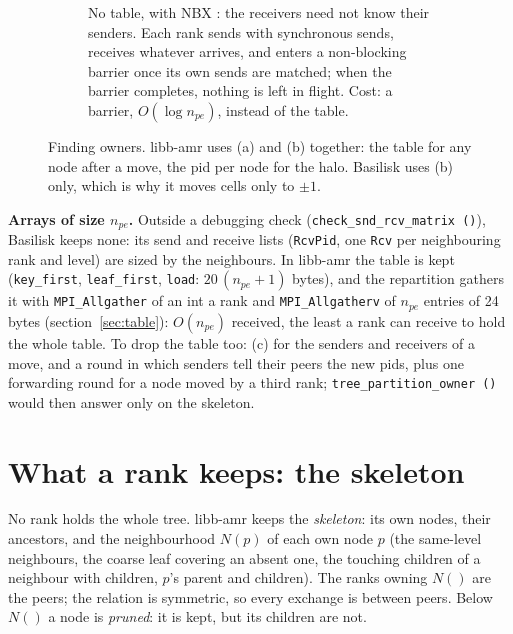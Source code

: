 \documentclass[10pt,a4paper]{article}
\theoremstyle{definition}
\newcommand{\fn}[1]{\texttt{#1}}
\begin{document}
\begin{figure}[h]
\begin{subfigure}[t]{0.54\textwidth}
    \caption{No table, with NBX \cite{nbx}: the receivers need not know
      their senders. Each rank sends with synchronous sends, receives
      whatever arrives, and enters a non-blocking barrier once its own
      sends are matched; when the barrier completes, nothing is left in
      flight. Cost: a barrier, $O(\log n_{pe})$, instead of the table.}
  \end{subfigure}
  \caption{Finding owners. libb-amr uses (a) and (b) together: the table
    for any node after a move, the pid per node for the halo. Basilisk
    uses (b) only, which is why it moves cells only to $\pm 1$.}
  \label{fig:owners}
\end{figure}

\textbf{Arrays of size $n_{pe}$.} Outside a debugging check
(\fn{check\_snd\_rcv\_matrix ()}), Basilisk keeps none: its send and
receive lists (\fn{RcvPid}, one \fn{Rcv} per neighbouring rank and level)
are sized by the neighbours. In libb-amr the table is kept (\fn{key\_first},
\fn{leaf\_first}, \fn{load}: $20\,(n_{pe}+1)$ bytes), and the repartition
gathers it with \fn{MPI\_Allgather} of an int a rank and
\fn{MPI\_Allgatherv} of $n_{pe}$ entries of 24 bytes
(section~\ref{sec:table}): $O(n_{pe})$ received, the least a rank can
receive to hold the whole table. To drop the table too: (c) for the
senders and receivers of a move, and a round in which senders tell their
peers the new pids, plus one forwarding round for a node moved by a third
rank; \fn{tree\_partition\_owner ()} would then answer only on the
skeleton.

\section{What a rank keeps: the skeleton}
\label{sec:skeleton}

No rank holds the whole tree. libb-amr keeps the \emph{skeleton}: its own
nodes, their ancestors, and the neighbourhood $N(p)$ of each own node $p$
(the same-level neighbours, the coarse leaf covering an absent one, the
touching children of a neighbour with children, $p$'s parent and
children). The ranks owning $N()$ are the peers; the relation is
symmetric, so every exchange is between peers. Below $N()$ a node is
\emph{pruned}: it is kept, but its children are not.
\end{document}
